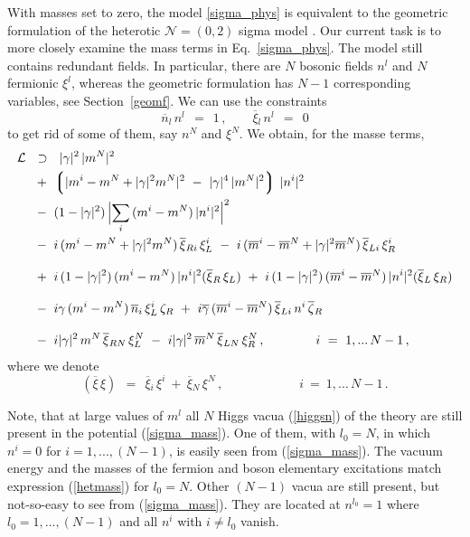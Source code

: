 \documentclass[12pt]{article}
\newcommand{\ntwoo}{${\mathcal N}= \left(0,2\right) $ }
\newcommand{\ov}{\overline}
\newcommand{\mc}[1]{\mathcal{#1}}
\newcommand{\lgr}{\left\lgroup}
\newcommand{\rgr}{\right\rgroup}
\newcommand{\bxir}{\ov{\xi}{}_R}
\newcommand{\bxil}{\ov{\xi}{}_L}
\newcommand{\xir}{\xi_R}
\newcommand{\xil}{\xi_L}
\newcommand{\bzr}{\ov{\zeta}{}_R}
\newcommand{\zr}{\zeta_R}
\begin{document}
	With masses set to zero, the model \eqref{sigma_phys} is equivalent to the 
	geometric formulation of the heterotic \ntwoo sigma model \cite{SYhet,BSYhet}.
Our current task is to more closely examine  the mass terms in Eq.~\eqref{sigma_phys}.
	The model still contains redundant fields.
	In particular, there are $N$ bosonic fields $n^l$ and $N$ fermionic $\xi^l$,
	whereas the geometric formulation has $N-1$ corresponding variables, see
	Section~\ref{geomf}.
	We can use the constraints
\[
	\ov{n}{}_l\, n^l ~~=~~ 1\,, \qquad \ov{\xi}{}_l\, n^l ~~=~~ 0
\]
	to get rid of some of them, say $ n^N $ and $ \xi^N $.
	We obtain, for the masse terms,
\begin{align}
%
\notag
	\mc{L} & ~~\supset~~ 
	|\gamma|^2\, |m^N|^2  
	\\
%
\notag
	&~
	~+~
	\lgr | m^i - m^N + |\gamma|^2 m^N |^2 ~-~ |\gamma|^4\, |m^N|^2 \rgr\, |n^i|^2 
	\\
%
\notag
	&~
	~-~ (1 - |\gamma|^2)\, \Bigl|\sum_i\, (m^i - m^N)\,|n^i|^2 \Bigr|^2
	\\
%	
\label{sigma_mass}
	&~
	~-~ i\,(m^i - m^N + |\gamma|^2 m^N )\,\ov{\xi}{}_{Ri}\,\xi_L^i
	~-~ i\,(\ov{m}{}^i - \ov{m}{}^N + |\gamma|^2\ov{m}{}^N)\, \ov{\xi}{}_{Li}\, \xi_R^i 
	\\[3mm]
%
\notag
	&~
	~+~ i\,(1-|\gamma|^2)\,(m^i - m^N)\,|n^i|^2(\bxir\,\xil) 
	~+~ i\,(1-|\gamma|^2)\,(\ov{m}{}^i - \ov{m}{}^N)\,|n^i|^2(\bxil\,\xir)
	\\[3mm]
%
\notag
	&~
	~-~ i \gamma\, (m^i - m^N)\, \ov{n}{}_i\, \xi_L^i\, \zr
	~+~ i \ov{\gamma}\, (\ov{m}{}^i - \ov{m}{}^N)\, \ov{\xi}{}_{Li}\, n^i\, \bzr
	\\[3mm]
%
\notag
	&~
	~-~ i |\gamma|^2\, m^N\, \ov{\xi}{}_{RN}\, \xi_L^N
	~-~ i |\gamma|^2\, \ov{m}^N\, \ov{\xi}{}_{LN}\, \xi_R^N\,,
	\qquad\qquad
	i ~=~ 1,...\,N-1\,,
\end{align}
	where we denote
\[
	(\ov{\xi}\, \xi) ~~=~~ \ov{\xi}{}_i\, \xi^i  ~+~  \ov{\xi}{}_N\, \xi^N\,,
	\qquad\qquad\qquad
	i ~=~ 1,...\,N-1\,.
\]

\vspace{2mm}

Note, that at large values of $m^l$ all $N$ Higgs vacua (\ref{higgsn}) of the theory  are
still present in the potential (\ref{sigma_mass}).
One of them, with $l_0=N$, in which  $n^i=0$ for {$i=1,...,(N-1)$},
is easily seen from (\ref{sigma_mass}). The vacuum energy and the
masses of the fermion and boson elementary excitations match
expression (\ref{hetmass}) for $l_0=N$. Other $(N-1)$
vacua are still present, but not-so-easy to see from (\ref{sigma_mass}).
They are located at $n^{l_0}=1$ where $l_0=1,...,(N-1)$ and  all $  n^i$ with $i\neq l_0$
vanish.
\end{document}

